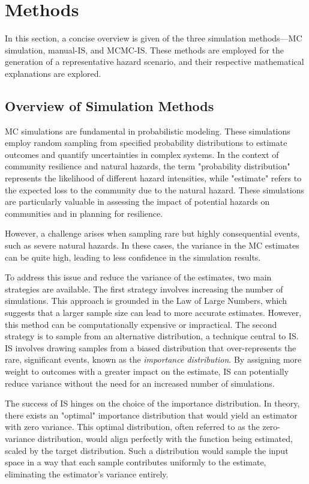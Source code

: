 \section{Methods}  
    In this section, a concise overview is given of the three simulation methods—MC simulation, manual-IS, and MCMC-IS. These methods are employed for the generation of a representative hazard scenario, and their respective mathematical explanations are explored. 

    \subsection{Overview of Simulation Methods}
        MC simulations are fundamental in probabilistic modeling. These simulations employ random sampling from specified probability distributions to estimate outcomes and quantify uncertainties in complex systems. In the context of community resilience and natural hazards, the term "probability distribution" represents the likelihood of different hazard intensities, while "estimate" refers to the expected loss to the community due to the natural hazard. These simulations are particularly valuable in assessing the impact of potential hazards on communities and in planning for resilience.

        However, a challenge arises when sampling rare but highly consequential events, such as severe natural hazards. In these cases, the variance in the MC estimates can be quite high, leading to less confidence in the simulation results. 

        To address this issue and reduce the variance of the estimates, two main strategies are available. The first strategy involves increasing the number of simulations. This approach is grounded in the Law of Large Numbers, which suggests that a larger sample size can lead to more accurate estimates. However, this method can be computationally expensive or impractical. The second strategy is to sample from an alternative distribution, a technique central to IS. IS involves drawing samples from a biased distribution that over-represents the rare, significant events, known as the \textit{importance distribution}. By assigning more weight to outcomes with a greater impact on the estimate, IS can potentially reduce variance without the need for an increased number of simulations.

        The success of IS hinges on the choice of the importance distribution. In theory, there exists an "optimal" importance distribution that would yield an estimator with zero variance. This optimal distribution, often referred to as the zero-variance distribution, would align perfectly with the function being estimated, scaled by the target distribution. Such a distribution would sample the input space in a way that each sample contributes uniformly to the estimate, eliminating the estimator's variance entirely.
        

